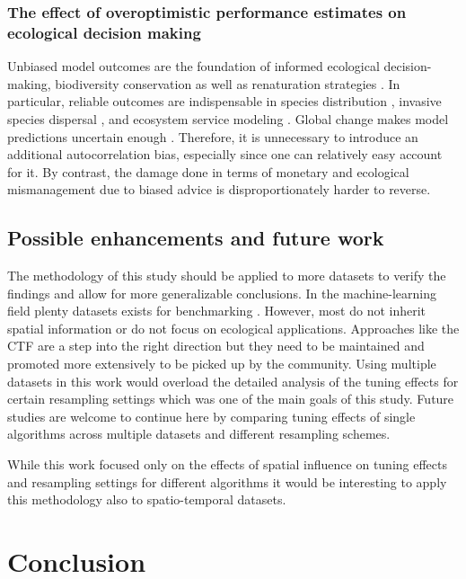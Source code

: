 \documentclass[review]{elsarticle}
\begin{document}
\subsubsection{The effect of overoptimistic performance estimates on ecological decision making}
\noindent Unbiased model outcomes are the foundation of informed ecological decision-making, biodiversity conservation as well as renaturation strategies \citep{muenchowReviewEcologicalGradient2018}. 
In particular, reliable outcomes are indispensable in species distribution \citep{loehleDisequilibriumRelaxationTimes2018}, invasive species dispersal \citep{srivastavaMappingInvasionPotential2018}, and ecosystem service modeling \citep{watanabeDynamicEmergyAccounting2014}. 
Global change makes model predictions uncertain enough \citep{ipccSummaryPolicymakers2013}. 
Therefore, it is unnecessary to introduce an additional autocorrelation bias, especially since one can relatively easy account for it. 
By contrast, the damage done in terms of monetary and ecological mismanagement due to biased advice is disproportionately harder to reverse.

\subsection{Possible enhancements and future work}

The methodology of this study should be applied to more datasets to verify the findings and allow for more generalizable conclusions. 
In the machine-learning field plenty datasets exists for benchmarking \citep{olsonPMLBLargeBenchmark2017, vanschorenOpenMLNetworkedScience2014}.
However, most do not inherit spatial information or do not focus on ecological applications.
Approaches like the \ac{CTF} \citep{wikleCommonTaskFramework2017} are a step into the right direction but they need to be maintained and promoted more extensively to be picked up by the community.
Using multiple datasets in this work would overload the detailed analysis of the tuning effects for certain resampling settings which was one of the main goals of this study.
Future studies are welcome to continue here by comparing tuning effects of single algorithms across multiple datasets and different resampling schemes.

While this work focused only on the effects of spatial influence on tuning effects and resampling settings for different algorithms it would be interesting to apply this methodology also to spatio-temporal datasets.

\section{Conclusion}
 
\end{document}
